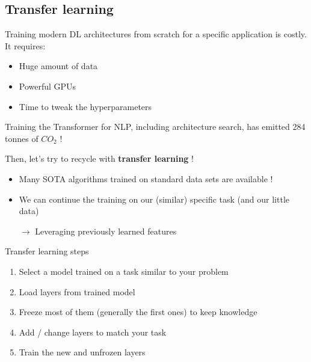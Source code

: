 \documentclass[usenames,dvipsnames]{beamer}
\begin{document}
    \subsection{Transfer learning}
    \begin{frame}{\secname}{\subsecname}
        Training modern DL architectures from scratch for a specific application is costly. It requires:
        \begin{itemize}
            \item Huge amount of data
            \item Powerful GPUs
            \item Time to tweak the hyperparameters
        \end{itemize}
        \vspace{-0.8em}
        \begin{alertblock}{}
            Training the Transformer \cite{vaswani2017attention} for NLP, including architecture search, has emitted 284 tonnes of $CO_2$ ! \cite{strubell2019energy} 
        \end{alertblock}

        Then, let's try to recycle with \textbf{transfer learning} !
        \begin{itemize}
            \item Many SOTA algorithms trained on standard data sets are available !
            \item We can continue the training on our (similar) specific task (and our little data)
            
            $\rightarrow$ Leveraging previously learned features
        \end{itemize}
    \end{frame}
    \begin{frame}{\secname}{\subsecname}
        Transfer learning steps
        \begin{enumerate}
            \item Select a model trained on a task similar to your problem
            \item Load layers from trained model
            \item Freeze most of them (generally the first ones) to keep knowledge
            \item Add / change layers to match your task
            \item Train the new and unfrozen layers
        \end{enumerate}
    \end{frame}
\end{document}
